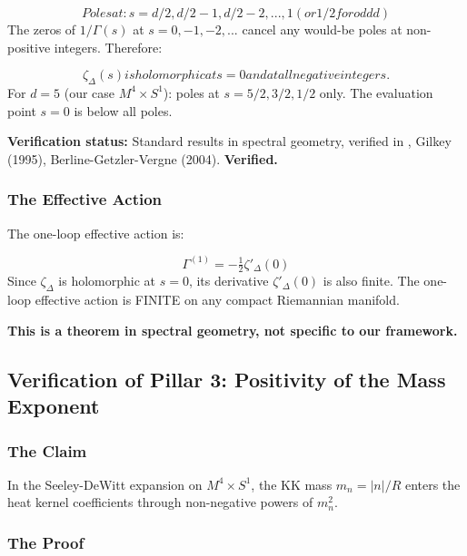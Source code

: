 \documentclass[aps,prd,preprint,superscriptaddress,longbibliography,floatfix]{revtex4-2}
\theoremstyle{remark}
\begin{document}
\begin{equation}
    Poles at: s = d/2, d/2 - 1, d/2 - 2, ..., 1 (or 1/2 for odd d)
\end{equation}
The zeros of $1/\Gamma(s)$ at $s = 0, -1, -2, ...$ cancel any would-be poles at non-positive integers. Therefore:


\begin{equation}
    \zeta_\Delta(s) is holomorphic at s = 0 and at all negative integers.
\end{equation}
For $d = 5$ (our case $M^{4} \times S^{1}$): poles at $s = 5/2, 3/2, 1/2$ only. The evaluation point $s = 0$ is below all poles.

\textbf{Verification status:} Standard results in spectral geometry, verified in \cite{Vassilevich2003}, Gilkey (1995), Berline-Getzler-Vergne (2004). \textbf{Verified.}


\subsubsection{The Effective Action}

The one-loop effective action is:


\begin{equation}
    \Gamma^{(1)} = -\tfrac{1}{2} \zeta'_\Delta(0)
\end{equation}
Since $\zeta_\Delta$ is holomorphic at $s = 0$, its derivative $\zeta'_\Delta(0)$ is also finite. The one-loop effective action is FINITE on any compact Riemannian manifold.

\textbf{This is a theorem in spectral geometry, not specific to our framework.}



\subsection{Verification of Pillar 3: Positivity of the Mass Exponent}


\subsubsection{The Claim}

In the Seeley-DeWitt expansion on $M^{4} \times S^{1}$, the KK mass $m_n = |n|/R$ enters the heat kernel coefficients through non-negative powers of $m_n^{2}$.


\subsubsection{The Proof}
\end{document}

